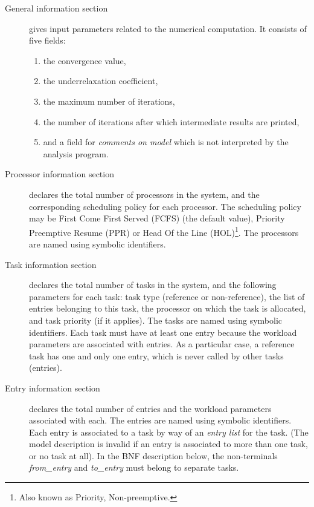 \documentclass{article}
\begin{document}
\begin{description}
\item [General information section] gives input parameters related to
  the numerical computation.  It consists of five fields:
  \begin{enumerate}
  \item the convergence value,
  \item the underrelaxation coefficient,
  \item the maximum number of iterations,
  \item the number of iterations after which intermediate results
    are printed,
  \item and a field for {\em comments on model} which is not
    interpreted by the analysis program.
  \end{enumerate}
  
\item [Processor information section] declares the total number of
  processors in the system, and the corresponding scheduling policy for
  each processor.  The scheduling policy may be First Come First Served
  (FCFS) (the default value), Priority Preemptive Resume (PPR) or Head
  Of the Line (HOL)\footnote{Also known as Priority, Non-preemptive.}.
  The processors are named using symbolic identifiers.
  
\item [Task information section] declares the total number of tasks in
  the system, and the following parameters for each task: task type
  (reference or non-reference), the list of entries belonging to this
  task, the processor on which the task is allocated, and task priority
  (if it applies). The tasks are named using symbolic identifiers. Each
  task must have at least one entry because the workload parameters are
  associated with entries.  As a particular case, a reference task has
  one and only one entry, which is never called by other tasks
  (entries).
  
\item [Entry information section] declares the total number of entries
  and the workload parameters associated with each. The entries are
  named using symbolic identifiers. Each entry is associated to a task
  by way of an {\em entry list} for the task. (The model description is
  invalid if an entry is associated to more than one task, or no task at
  all).  In the BNF description below, the non-terminals {\em
  from\_entry\/} and {\em to\_entry\/} must belong to separate tasks.


\end{description}
\end{document}

